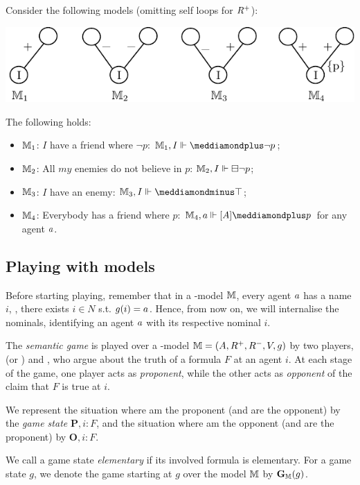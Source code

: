 \begin{example}
Consider the following models (omitting self loops for $\R^+$):
\begin{center}
\includegraphics{fig-pnl}
\end{center}
The following holds:
\begin{itemize}
\item$\mathbb{M}_1$: $I$ have a friend where $\neg p$: $\M_1, I \Vdash \dplus\neg p$;
\item$\mathbb{M}_2$: All $my$ enemies do not believe in $p$: $\mathbb{M}_2, I \Vdash \boxminus\neg p$;
\item$\mathbb{M}_3$: $I$ have an enemy: $\M_3, I \Vdash \dminus\top$;
\item$\mathbb{M}_4$: Everybody has a friend where $p$: $\M_4, \ag \Vdash  [A ]  \dplus p$ for any agent $\ag$.
\end{itemize} 
 \end{example}


\subsection{Playing with models}\label{sec:game-semantics}
Before starting playing, remember that in a \PNL-model $\mathbb{M}$, every agent $\ag$ has a name $i$, \ie, there exists $i\in N$ s.t. $\g(i)=\ag$. Hence, from now on, we will internalise the nominals, identifying an agent $\ag$ with its respective nominal $i$.

The  \emph{semantic game} is played over a \PNL-model $\M=(\A,\R^+,\R^-,\V,\g)$ by two
players, \Me (or \Ic) and \You, who argue about the truth of a formula $ F $ at an
agent $i$. At each stage of the game, one player acts as \emph{proponent}, while the
other acts as \emph{opponent} of the claim that  $ F $ is true at 
$i$. 

We represent the situation where \Ic am the proponent (and \You are the
opponent) by the \emph{game state} $\mathbf{P}, i: F $, and the situation
where \Ic am the opponent (and \You are the proponent) by $\mathbf{O},
i: F $. 

We call a game state \emph{elementary} if its involved formula is elementary. For a game state $g$, we denote the game starting at $g$ over the model $\mathbb{M}$ by $\mathbf{G}_{\mathbb{M}}(g)$.


